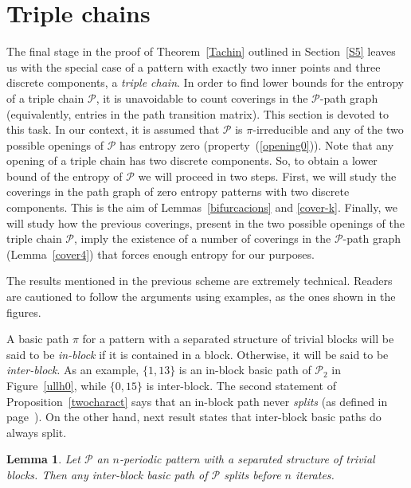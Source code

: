 \documentclass[a4paper]{amsart}
\newtheorem{lemma}[theorem]{Lemma}
\theoremstyle{definition}
\begin{document}
\section{Triple chains}\label{S9}
The final stage in the proof of Theorem~\ref{Tachin} outlined in Section~\ref{S5} leaves us with the special case of a pattern
with exactly two inner points and three discrete components, a \emph{triple chain}. In order to find lower bounds for the entropy of
a triple chain $\mathcal{P}$, it is unavoidable to count coverings in the $\mathcal{P}$-path graph (equivalently, entries in the
path transition matrix). This section is devoted to this task. In our context, it is assumed that $\mathcal{P}$ is $\pi$-irreducible and
any of the two possible openings of $\mathcal{P}$ has entropy zero (property~(\ref{opening0})). Note that any opening of a triple chain has
two discrete components. So, to obtain a lower bound of the entropy of $\mathcal{P}$ we will proceed in two steps. First, we
will study the coverings in the path graph of zero entropy patterns with two discrete components. This is the aim of Lemmas~\ref{bifurcacions}
and \ref{cover-k}. Finally, we will study how the previous coverings, present in the two possible openings of the triple chain $\mathcal{P}$,
imply the existence of a number of coverings in the $\mathcal{P}$-path graph (Lemma~\ref{cover4}) that forces enough entropy for our purposes.

The results mentioned in the previous scheme are extremely technical. Readers are cautioned to follow the arguments using examples,
as the ones shown in the figures.

A basic path $\pi$ for a pattern with a separated structure of trivial blocks will be said to be \emph{in-block}
if it is contained in a block. Otherwise, it will be said to be \emph{inter-block}. As an example, $\{1,13\}$ is
an in-block basic path of $\mathcal{P}_2$ in Figure~\ref{ullh0}, while $\{0,15\}$ is inter-block.
The second statement of Proposition~\ref{twocharact} says that an in-block path never \emph{splits} (as defined in page~\pageref{pagesplit}).
On the other hand, next result states that inter-block basic paths do always split.

\begin{lemma}\label{inter-blocks}
Let $\mathcal{P}$ an $n$-periodic pattern with a separated structure of trivial blocks. Then any inter-block basic path of $\mathcal{P}$ splits before $n$ iterates.
\end{lemma}
\end{document}

